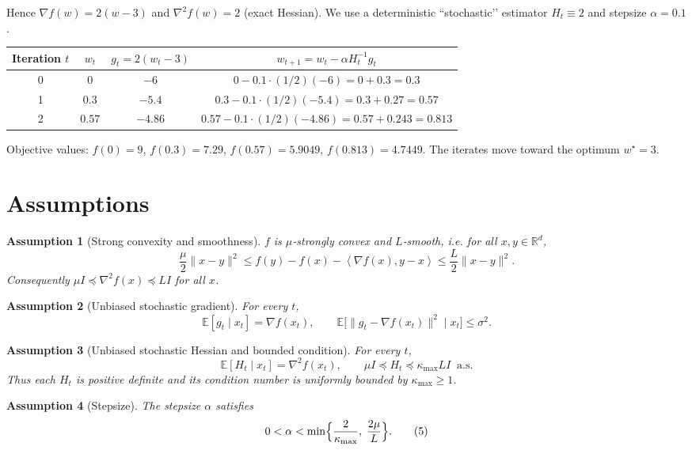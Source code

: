 \documentclass{article}
\newtheorem{assumption}{Assumption}
\newcommand{\E}{\mathbb{E}}
\newcommand{\ip}[2]{\left\langle #1,#2\right\rangle}
\newcommand{\R}{\mathbb{R}}
\newcommand{\grad}{\nabla}
\begin{document}
Hence $\grad f(w)=2(w-3)$ and $\nabla^2 f(w)=2$ (exact Hessian).  
We use a deterministic “stochastic’’ estimator $H_t\equiv 2$ and stepsize $\alpha=0.1$.

\begin{center}
\begin{tabular}{c c c c}
\toprule
Iteration $t$ & $w_t$ & $g_t=2(w_t-3)$ & $w_{t+1}=w_t-\alpha H_t^{-1}g_t$ \\
\midrule
0 & $0$ & $-6$ & $0-0.1\cdot(1/2)(-6)=0+0.3=0.3$ \\
1 & $0.3$ & $-5.4$ & $0.3-0.1\cdot(1/2)(-5.4)=0.3+0.27=0.57$ \\
2 & $0.57$ & $-4.86$ & $0.57-0.1\cdot(1/2)(-4.86)=0.57+0.243=0.813$ \\
\bottomrule
\end{tabular}
\end{center}
Objective values: $f(0)=9$, $f(0.3)=7.29$, $f(0.57)=5.9049$, $f(0.813)=4.7449$.  
The iterates move toward the optimum $w^\star=3$.

\newpage
\section*{Assumptions}
\begin{assumption}[Strong convexity and smoothness]\label{as:sc}
$f$ is $\mu$‑strongly convex and $L$‑smooth, i.e. for all $x,y\in\R^d$,
\[
\frac{\mu}{2}\|x-y\|^2\le f(y)-f(x)-\ip{\grad f(x)}{y-x}\le
\frac{L}{2}\|x-y\|^2 .
\tag{2}
\]
Consequently $ \mu I \preceq \nabla^2 f(x) \preceq L I$ for all $x$.
\end{assumption}

\begin{assumption}[Unbiased stochastic gradient]\label{as:grad}
For every $t$, 
\[
\E[g_t\mid x_t]=\grad f(x_t),\qquad 
\E\big[\|g_t-\grad f(x_t)\|^2\mid x_t\big]\le\sigma^2 .
\tag{3}
\]
\end{assumption}

\begin{assumption}[Unbiased stochastic Hessian and bounded condition]\label{as:hess}
For every $t$, 
\[
\E[H_t\mid x_t]=\nabla^2 f(x_t),\qquad
\mu I \preceq H_t \preceq \kappa_{\max} L I\;\; \text{a.s.}
\tag{4}
\]
Thus each $H_t$ is positive definite and its condition number is uniformly bounded by $\kappa_{\max}\ge 1$.
\end{assumption}

\begin{assumption}[Stepsize]\label{as:step}
The stepsize $\alpha$ satisfies 
\[
0<\alpha<\min\Bigl\{\frac{2}{\kappa_{\max}},\;\frac{2\mu}{L}\Bigr\}.
\tag{5}
\]
\end{assumption}
\end{document}
